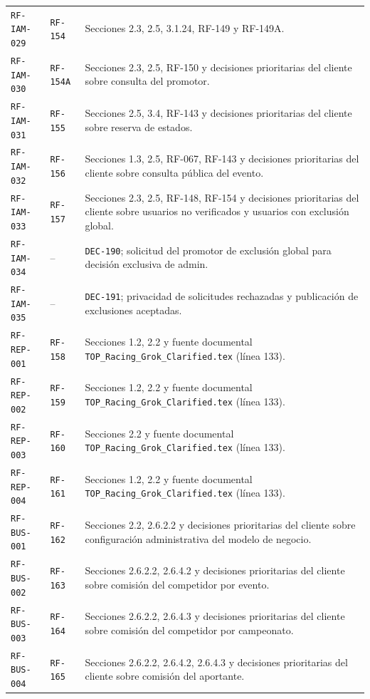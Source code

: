 \documentclass[10pt,letterpaper]{article}
\begin{document}
\begin{landscape}
\begin{longtable}{P{2.7cm}P{2.6cm}P{15.7cm}}
\texttt{RF-IAM-029} & \texttt{RF-154} & Secciones 2.3, 2.5, 3.1.24, RF-149 y RF-149A.\\
\texttt{RF-IAM-030} & \texttt{RF-154A} & Secciones 2.3, 2.5, RF-150 y decisiones prioritarias del cliente sobre consulta del promotor.\\
\texttt{RF-IAM-031} & \texttt{RF-155} & Secciones 2.5, 3.4, RF-143 y decisiones prioritarias del cliente sobre reserva de estados.\\
\texttt{RF-IAM-032} & \texttt{RF-156} & Secciones 1.3, 2.5, RF-067, RF-143 y decisiones prioritarias del cliente sobre consulta pública del evento.\\
\texttt{RF-IAM-033} & \texttt{RF-157} & Secciones 2.3, 2.5, RF-148, RF-154 y decisiones prioritarias del cliente sobre usuarios no verificados y usuarios con exclusión global.\\
\texttt{RF-IAM-034} & -- & \texttt{DEC-190}; solicitud del promotor de exclusión global para decisión exclusiva de admin.\\
\texttt{RF-IAM-035} & -- & \texttt{DEC-191}; privacidad de solicitudes rechazadas y publicación de exclusiones aceptadas.\\
\texttt{RF-REP-001} & \texttt{RF-158} & Secciones 1.2, 2.2 y fuente documental \texttt{TOP\_Racing\_Grok\_Clarified.tex} (línea 133).\\
\texttt{RF-REP-002} & \texttt{RF-159} & Secciones 1.2, 2.2 y fuente documental \texttt{TOP\_Racing\_Grok\_Clarified.tex} (línea 133).\\
\texttt{RF-REP-003} & \texttt{RF-160} & Secciones 2.2 y fuente documental \texttt{TOP\_Racing\_Grok\_Clarified.tex} (línea 133).\\
\texttt{RF-REP-004} & \texttt{RF-161} & Secciones 1.2, 2.2 y fuente documental \texttt{TOP\_Racing\_Grok\_Clarified.tex} (línea 133).\\
\texttt{RF-BUS-001} & \texttt{RF-162} & Secciones 2.2, 2.6.2.2 y decisiones prioritarias del cliente sobre configuración administrativa del modelo de negocio.\\
\texttt{RF-BUS-002} & \texttt{RF-163} & Secciones 2.6.2.2, 2.6.4.2 y decisiones prioritarias del cliente sobre comisión del competidor por evento.\\
\texttt{RF-BUS-003} & \texttt{RF-164} & Secciones 2.6.2.2, 2.6.4.3 y decisiones prioritarias del cliente sobre comisión del competidor por campeonato.\\
\texttt{RF-BUS-004} & \texttt{RF-165} & Secciones 2.6.2.2, 2.6.4.2, 2.6.4.3 y decisiones prioritarias del cliente sobre comisión del aportante.\\

\end{longtable}
\end{landscape}
\end{document}
